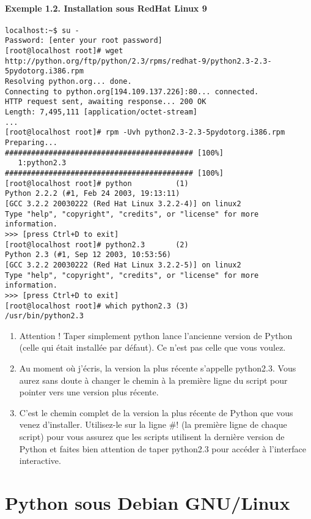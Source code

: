 \paragraph*{Exemple 1.2. Installation sous RedHat Linux 9}

\begin{lstlisting}
localhost:~$ su -
Password: [enter your root password]
[root@localhost root]# wget http://python.org/ftp/python/2.3/rpms/redhat-9/python2.3-2.3-5pydotorg.i386.rpm
Resolving python.org... done.
Connecting to python.org[194.109.137.226]:80... connected.
HTTP request sent, awaiting response... 200 OK
Length: 7,495,111 [application/octet-stream]
...
[root@localhost root]# rpm -Uvh python2.3-2.3-5pydotorg.i386.rpm
Preparing...                ########################################### [100%]
   1:python2.3              ########################################### [100%]
[root@localhost root]# python          (1)
Python 2.2.2 (#1, Feb 24 2003, 19:13:11)
[GCC 3.2.2 20030222 (Red Hat Linux 3.2.2-4)] on linux2
Type "help", "copyright", "credits", or "license" for more information.
>>> [press Ctrl+D to exit]
[root@localhost root]# python2.3       (2)
Python 2.3 (#1, Sep 12 2003, 10:53:56)
[GCC 3.2.2 20030222 (Red Hat Linux 3.2.2-5)] on linux2
Type "help", "copyright", "credits", or "license" for more information.
>>> [press Ctrl+D to exit]
[root@localhost root]# which python2.3 (3)
/usr/bin/python2.3
\end{lstlisting}

\begin{enumerate}
    \item{Attention ! Taper simplement python lance l'ancienne version de Python (celle qui était installée par défaut). Ce n'est pas celle que vous voulez.}
    \item{Au moment où j'écris, la version la plus récente s'appelle python2.3. Vous aurez sans doute à changer le chemin à la première ligne du script pour pointer vers une version plus récente.}
    \item{C'est le chemin complet de la version la plus récente de Python que vous venez d'installer. Utilisez-le sur la ligne \#! (la première ligne de chaque script)  pour vous assurez que les scripts utilisent la dernière version de Python et faites bien attention de taper python2.3 pour accéder à l'interface interactive.}
\end{enumerate}

\section{Python sous Debian GNU/Linux}\label{Python sous Debian GNU/Linux}

